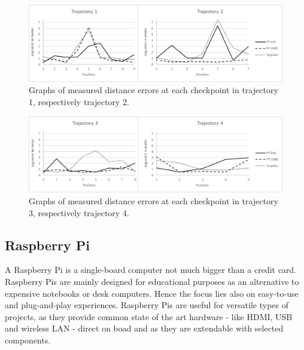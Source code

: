 \begin{figure}[th]
\centering
\includegraphics[width=1.0\textwidth]{Figures/trajectory1_2_results}
\decoRule
\caption[Positioning results trajectory 1 and 2]{Graphs of measured distance errors at each checkpoint in trajectory 1, respectively trajectory 2.}
\label{fig:trajectory1and2_results}
\end{figure}



\begin{figure}[th]
\centering
\includegraphics[width=1.0\textwidth]{Figures/trajectory3_4_results}
\decoRule
\caption[Positioning results trajectory 3 and 4]{Graphs of measured distance errors at each checkpoint in trajectory 3, respectively trajectory 4.}
\label{fig:trajectory3and4_results}
\end{figure}


\subsection{Raspberry Pi}
A Raspberry Pi is a single-board computer not much bigger than a credit card. Raspberry Pis are mainly designed for educational purposes as an alternative to expensive notebooks or desk computers. Hence the focus lies also on easy-to-use and plug-and-play experiences. Raspberry Pis are useful for versatile types of projects, as they provide common state of the art hardware - like HDMI, USB and wireless LAN - direct on boad and as they are extendable with selected components.



